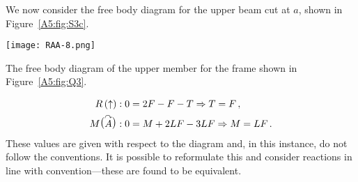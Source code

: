 \documentclass[a4paper,justified,oneside]{tufte-handout}
\numberwithin{equation}{subsection}
\begin{document}
\begin{solution}
We now consider the free body diagram for the upper beam cut at $a$, shown in Figure~\ref{A5:fig:S3c}.
\begin{marginfigure}
	\centering
	\texttt{[image: RAA-8.png]}
	\caption{The free body diagram of the upper member for the frame shown in Figure~\protect\ref{A5:fig:Q3}.}
	\label{A5:fig:S3c}
\end{marginfigure}
\begin{align*}
	R\left(\uparrow\right):	0&= 2F - F - T	\Rightarrow	T=F	\,,\\
	M\raisebox{1.5pt}{\big(}\overset{\curvearrowright}{A}\raisebox{1.5pt}{\big)}: 0&=M+2LF-3LF	\Rightarrow	M=LF \,.
\end{align*}
These values are given with respect to the diagram and, in this instance, do not follow the conventions. It is possible to reformulate this and consider reactions in line with convention---these are found to be equivalent. 
\end{solution}
\end{document}
